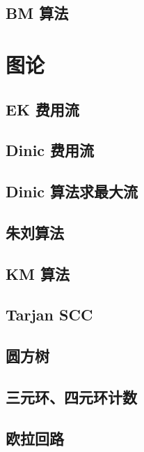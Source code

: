 \documentclass[a4paper,12pt]{article}
\begin{document}
\subsection{BM 算法}


\section{图论}

\subsection{EK 费用流}

\subsection{Dinic 费用流}

\subsection{Dinic 算法求最大流}

\subsection{朱刘算法}

\subsection{KM 算法}

\subsection{Tarjan SCC}

\subsection{圆方树}

\subsection{三元环、四元环计数}

\subsection{欧拉回路}

\end{document}
